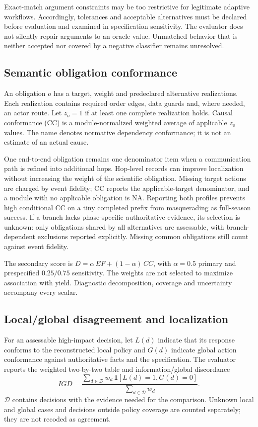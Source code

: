 \documentclass[sigconf,anonymous]{aamas}
\begin{document}
Exact-match argument constraints may be too restrictive for legitimate adaptive workflows. Accordingly, tolerances and acceptable alternatives must be declared before evaluation and examined in specification sensitivity. The evaluator does not silently repair arguments to an oracle value. Unmatched behavior that is neither accepted nor covered by a negative classifier remains unresolved.

\subsection{Semantic obligation conformance}
An obligation $o$ has a target, weight and predeclared alternative realizations. Each realization contains required order edges, data guards and, where needed, an actor route. Let $z_o=1$ if at least one complete realization holds. Causal conformance (CC) is a module-normalized weighted average of applicable $z_o$ values. The name denotes normative dependency conformance; it is not an estimate of an actual cause.

One end-to-end obligation remains one denominator item when a communication path is refined into additional hops. Hop-level records can improve localization without increasing the weight of the scientific obligation. Missing target actions are charged by event fidelity; CC reports the applicable-target denominator, and a module with no applicable obligation is NA. Reporting both profiles prevents high conditional CC on a tiny completed prefix from masquerading as full-season success. If a branch lacks phase-specific authoritative evidence, its selection is unknown: only obligations shared by all alternatives are assessable, with branch-dependent exclusions reported explicitly. Missing common obligations still count against event fidelity.

The secondary score is $D=\alpha\,EF+(1-\alpha)\,CC$, with $\alpha=0.5$ primary and prespecified $0.25/0.75$ sensitivity. The weights are not selected to maximize association with yield. Diagnostic decomposition, coverage and uncertainty accompany every scalar.

\subsection{Local/global disagreement and localization}
For an assessable high-impact decision, let $L(d)$ indicate that its response conforms to the reconstructed local policy and $G(d)$ indicate global action conformance against authoritative facts and the specification. The evaluator reports the weighted two-by-two table and information/global discordance
\[
 IGD=\frac{\sum_{d\in\mathcal D}w_d\,\mathbf1[L(d)=1,G(d)=0]}
 {\sum_{d\in\mathcal D}w_d}.
\]
$\mathcal D$ contains decisions with the evidence needed for the comparison. Unknown local and global cases and decisions outside policy coverage are counted separately; they are not recoded as agreement.
\end{document}
